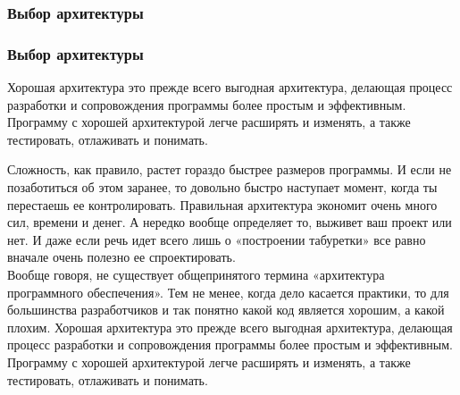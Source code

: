 \documentclass{../industrial-development}
\begin{document}
\subsubsection{Выбор архитектуры}
\begin{frame} \frametitle{Выбор архитектуры}
  Хорошая архитектура это прежде всего выгодная архитектура, делающая процесс разработки и сопровождения программы более простым и эффективным. Программу с хорошей архитектурой легче расширять и изменять, а также тестировать, отлаживать и понимать.
\end{frame}
\lecturenotes
Сложность, как правило, растет гораздо быстрее размеров программы. И если не позаботиться об этом заранее, то довольно быстро наступает момент, когда ты перестаешь ее контролировать. Правильная архитектура экономит очень много сил, времени и денег. А нередко вообще определяет то, выживет ваш проект или нет. И даже если речь идет всего лишь о «построении табуретки» все равно вначале очень полезно ее спроектировать.\\
Вообще говоря, не существует общепринятого термина «архитектура программного обеспечения». Тем не менее, когда дело касается практики, то для большинства разработчиков и так понятно какой код является хорошим, а какой плохим. Хорошая архитектура это прежде всего выгодная архитектура, делающая процесс разработки и сопровождения программы более простым и эффективным. Программу с хорошей архитектурой легче расширять и изменять, а также тестировать, отлаживать и понимать.
\end{document}
